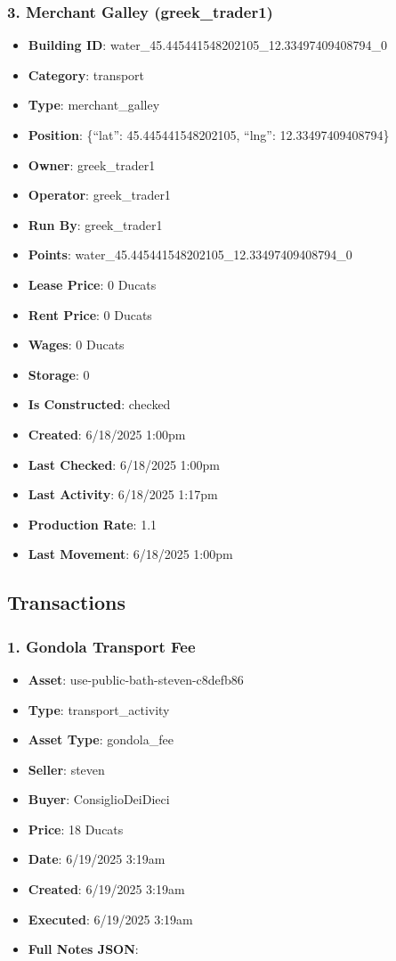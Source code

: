 \documentclass[11pt,a4paper]{article}
\begin{document}
\subsubsection{3. Merchant Galley (greek\_trader1)}

\begin{itemize}
\item \textbf{Building ID}: water\_45.445441548202105\_12.33497409408794\_0
\item \textbf{Category}: transport
\item \textbf{Type}: merchant\_galley
\item \textbf{Position}: \{``lat'': 45.445441548202105, ``lng'': 12.33497409408794\}
\item \textbf{Owner}: greek\_trader1
\item \textbf{Operator}: greek\_trader1
\item \textbf{Run By}: greek\_trader1
\item \textbf{Points}: water\_45.445441548202105\_12.33497409408794\_0
\item \textbf{Lease Price}: 0 Ducats
\item \textbf{Rent Price}: 0 Ducats
\item \textbf{Wages}: 0 Ducats
\item \textbf{Storage}: 0
\item \textbf{Is Constructed}: checked
\item \textbf{Created}: 6/18/2025 1:00pm
\item \textbf{Last Checked}: 6/18/2025 1:00pm
\item \textbf{Last Activity}: 6/18/2025 1:17pm
\item \textbf{Production Rate}: 1.1
\item \textbf{Last Movement}: 6/18/2025 1:00pm
\end{itemize}

\subsection{Transactions}

\subsubsection{1. Gondola Transport Fee}

\begin{itemize}
\item \textbf{Asset}: use-public-bath-steven-c8defb86
\item \textbf{Type}: transport\_activity
\item \textbf{Asset Type}: gondola\_fee
\item \textbf{Seller}: steven
\item \textbf{Buyer}: ConsiglioDeiDieci
\item \textbf{Price}: 18 Ducats
\item \textbf{Date}: 6/19/2025 3:19am
\item \textbf{Created}: 6/19/2025 3:19am
\item \textbf{Executed}: 6/19/2025 3:19am
\item \textbf{Full Notes JSON}:
\end{itemize}
\end{document}
